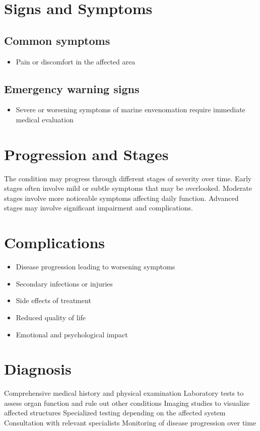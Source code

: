 \section{Signs and Symptoms}

\subsection{Common symptoms}
\begin{itemize}[noitemsep]
  \item Pain or discomfort in the affected area
  \end{itemize}

\subsection{Emergency warning signs}
\begin{itemize}[noitemsep]
  \item Severe or worsening symptoms of marine envenomation require immediate medical evaluation
\end{itemize}
\section{Progression and Stages}
The condition may progress through different stages of severity over time. Early stages often involve mild or subtle symptoms that may be overlooked. Moderate stages involve more noticeable symptoms affecting daily function. Advanced stages may involve significant impairment and complications.
\section{Complications}
\begin{itemize}[noitemsep]
  \item Disease progression leading to worsening symptoms
  \item Secondary infections or injuries
  \item Side effects of treatment
  \item Reduced quality of life
  \item Emotional and psychological impact
\end{itemize}
\section{Diagnosis}
Comprehensive medical history and physical examination Laboratory tests to assess organ function and rule out other conditions Imaging studies to visualize affected structures Specialized testing depending on the affected system Consultation with relevant specialists Monitoring of disease progression over time

